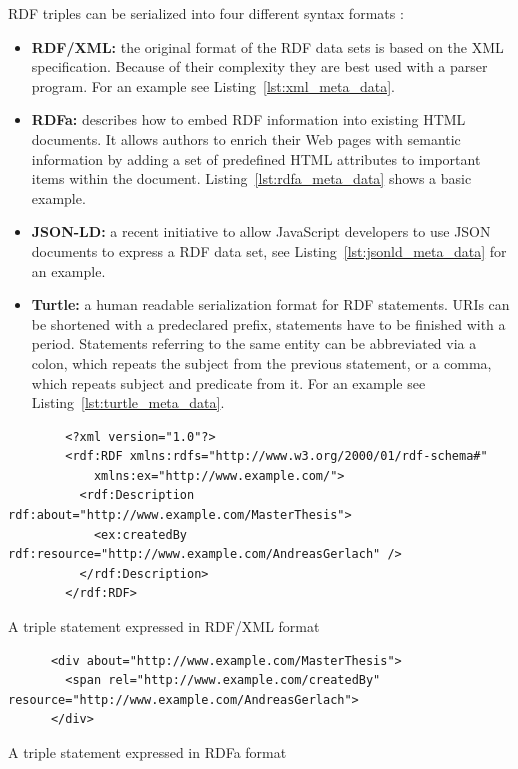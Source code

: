 \gls{RDF} triples can be serialized into four different syntax formats \citep[pg. 43-54]{wood2014linked}: \@

\begin{itemize}

	\item \textbf{\gls{RDF}/\gls{XML}:} the original format of the \gls{RDF} data sets is based on the \gls{XML} specification. Because of their complexity they are best used with a parser program. For an example see Listing~\ref{lst:xml_meta_data}.
	\item \textbf{\gls{RDFa}:} describes how to embed \gls{RDF} information into existing \gls{HTML} documents. It allows authors to enrich their Web pages with semantic information by adding a set of predefined \gls{HTML} attributes to important items within the document. Listing~\ref{lst:rdfa_meta_data} shows a basic example.
	\item \textbf{\gls{JSON-LD}:} a recent initiative to allow JavaScript developers to use \gls{JSON} documents to express a \gls{RDF} data set, see Listing~\ref{lst:jsonld_meta_data} for an example.
	\item \textbf{Turtle:} a human readable serialization format for \gls{RDF} statements. \gls{URI}s can be shortened with a predeclared prefix, statements have to be finished with a period. Statements referring to the same entity can be abbreviated via a colon, which repeats the subject from the previous statement, or a comma, which repeats subject and predicate from it. For an example see Listing~\ref{lst:turtle_meta_data}.
\end{itemize}

\begin{listing}[H]
	\begin{verbatim}
		<?xml version="1.0"?>
		<rdf:RDF xmlns:rdfs="http://www.w3.org/2000/01/rdf-schema#"
			xmlns:ex="http://www.example.com/">
		  <rdf:Description rdf:about="http://www.example.com/MasterThesis">
		    <ex:createdBy rdf:resource="http://www.example.com/AndreasGerlach" />
		  </rdf:Description>
		</rdf:RDF>
	\end{verbatim}
\caption{A triple statement expressed in \gls{RDF}/\gls{XML} format}
\label{lst:xml_meta_data}
\end{listing}

\begin{listing}[H]
	\begin{verbatim}
	  <div about="http://www.example.com/MasterThesis">
	    <span rel="http://www.example.com/createdBy" resource="http://www.example.com/AndreasGerlach">
	  </div>
	\end{verbatim}
\caption{A triple statement expressed in \gls{RDFa} format}
\label{lst:rdfa_meta_data}
\end{listing}

